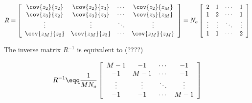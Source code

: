 \begin{theorem}
\[
   R =
   \left[
   \begin{array}{cccc}
      \cov{z_2}{z_2}  & \cov{z_2}{z_3} & \cdots & \cov{z_2}{z_M}  \\
      \cov{z_3}{z_2}  & \cov{z_3}{z_3} & \cdots & \cov{z_3}{z_M}  \\
      \vdots          & \vdots         & \ddots & \vdots          \\
      \cov{z_M}{z_2}  & \cov{z_M}{z_3} & \cdots & \cov{z_M}{z_M}
   \end{array}
   \right]
   =
   N_o \left[
   \begin{array}{cccc}
      2      & 1      &  \cdots &  1     \\
      1      & 2      &  \cdots &  1     \\
      \vdots & \vdots &  \ddots & \vdots \\
      1      & 1      &  \cdots &  2
   \end{array}
   \right]
\]


The inverse matrix $R^{-1}$ is equivalent to (????) \attention

\[
   R^{-1} \eqq
   \frac{1}{MN_o} \left[
   \begin{array}{cccc}
      M-1     & -1      &  \cdots &  -1     \\
      -1      & M-1     &  \cdots &  -1     \\
      \vdots  & \vdots  &  \ddots & \vdots  \\
      -1      & -1      &  \cdots & M-1
   \end{array}
   \right]
\]
\end{theorem}


